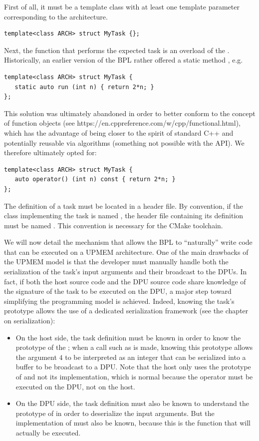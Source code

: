 First of all, it must be a template class with at least one template parameter corresponding to the architecture.
\begin{verbatim}
template<class ARCH> struct MyTask {};
\end{verbatim}
	
Next, the function that performs the expected task is an overload of the . Historically, an earlier version 
of the BPL rather offered a static method , e.g.
\begin{verbatim}
template<class ARCH> struct MyTask {
   static auto run (int n) { return 2*n; }
};
\end{verbatim}
This solution was ultimately abandoned in order to better conform to the concept of function objects 
(see https://en.cppreference.com/w/cpp/functional.html), which has the advantage of being closer to 
the spirit of standard C++ and potentially reusable via  algorithms
 (something not possible with the  API). We therefore ultimately opted for:
\begin{verbatim}
template<class ARCH> struct MyTask {
   auto operator() (int n) const { return 2*n; }
};
\end{verbatim}

The definition of a task must be located in a header file. By convention, if the class implementing the task is named
 , the header file containing its definition must be named . This convention is necessary for the
  CMake toolchain.

We will now detail the mechanism that allows the BPL to “naturally” write code that can be executed on a UPMEM architecture.
 One of the main drawbacks of the UPMEM model is that the developer must manually handle both the serialization of the task’s 
 input arguments and their broadcast to the DPUs. In fact, if both the host source code and the DPU source code share knowledge 
 of the signature of the task to be executed on the DPU, a major step toward simplifying the programming model is achieved. 
 Indeed, knowing the task’s prototype allows the use of a dedicated serialization framework (see the chapter on serialization):
\begin{itemize}
\item On the host side, the task definition must be known in order to know the prototype of the ;
 when a call such as  is made, knowing this prototype allows the argument $4$ to be interpreted 
 as an integer that can be serialized into a buffer to be broadcast to a DPU. Note that the host only uses the prototype of 
  and not its implementation, which is normal because the operator must be executed on the DPU, not on the host.
\item On the DPU side, the task definition must also be known to understand the prototype of  in order to 
deserialize the input arguments. But the implementation of  must also be known, because this is the function 
that will actually be executed.
\end{itemize}

